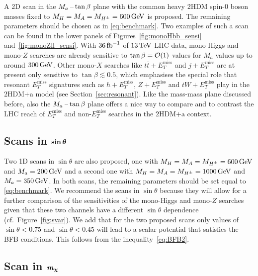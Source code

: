 \documentclass[a4paper, 11pt,notoc]{article}
\newcommand{\MET}{\ensuremath{E_T^\mathrm{miss}}\xspace}
\newcommand{\mA}{\ensuremath{M_{A}}\xspace}
\newcommand{\ma}{\ensuremath{M_{a}}\xspace}
\newcommand{\mH}{\ensuremath{M_{H}}\xspace}
\newcommand{\mHc}{\ensuremath{M_{H^{\pm}}}\xspace}
\newcommand{\hdma}{\ensuremath{\textrm{2HDM+a}}\xspace}
\def\bm#1{\mbox{\boldmath$#1$\unboldmath}}
\begin{document}
A 2D scan in the  $\ma\hspace{0.5mm}$--$\hspace{0.5mm} \tan \beta$ plane with  the common heavy 2HDM  spin-0 boson  masses fixed to $\mH = \mA = \mHc = 600 \, {\rm GeV}$ is proposed.  The remaining parameters should be chosen as in \eqref{eq:benchmark}. Two examples of such a scan can be found in the lower panels of Figures~\ref{fig:monoHbb_sensi} and~\ref{fig:monoZll_sensi}. With $36 \, {\rm fb}^{-1}$ of $13 \, {\rm TeV}$ LHC data, mono-Higgs and mono-$Z$ searches are already sensitive to $\tan \beta = {\cal O} (1)$ values for $M_a$ values up to around $300 \, {\rm GeV}$. Other mono-$X$ searches like $t \bar t +\MET$ and $j + \MET$ are at present only sensitive to $\tan \beta \lesssim 0.5$, which emphasises the special role that  resonant $\MET$ signatures such as $h + \MET$, $Z + \MET$ and $tW + \MET$ play in the \hdma model (see Section~\ref{sec:resonant}). Like  the mass-mass plane discussed before, also the $\ma\hspace{0.5mm}$--$\hspace{0.5mm} \tan \beta$ plane offers a nice way to compare and to contrast the LHC reach of $\MET$ and non-$\MET$ searches in the \hdma context. 

\subsection[Scans in $\sin \theta$]{Scans in $\bm{\sin \theta}$}

Two 1D  scans in $\sin \theta$ are also proposed, one with $\mH = \mA = \mHc = 600 \, {\rm GeV}$ and $\ma = 200 \, {\rm GeV}$ and a second one with $\mH = \mA = \mHc = 1000 \, {\rm GeV}$ and $\ma = 350 \, {\rm GeV}$. In both scans, the remaining parameters should be set equal to \eqref{eq:benchmark}.  We recommend the scans in $\sin \theta$ because they will  allow for a further comparison of the sensitivities of the mono-Higgs and mono-$Z$ searches given that these two channels have a different $\sin \theta$ dependence (cf.~Figure~\ref{fig:svar}).  We add that for the two proposed scans only values of $\sin \theta < 0.75$ and $\sin \theta < 0.45$ will lead to a scalar potential that satisfies the BFB conditions. This follows from the inequality~\eqref{eq:BFB2}.

\subsection[Scan in $m_\chi$]{Scan in $\bm{m_\chi}$}
\end{document}
